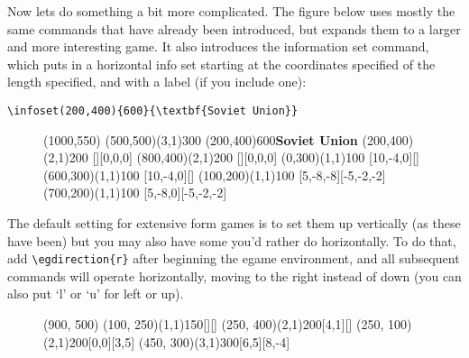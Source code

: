 \documentclass[10.5pt]{article}
\begin{document}
Now lets do something a bit more complicated.  The figure below uses mostly the same commands that have already been introduced, but expands them to a larger and more interesting game.  It also introduces the information set command, which puts in a horizontal info set starting at the coordinates specified of the length specified, and with a label (if you include one):
\begin{verbatim}
\infoset(200,400){600}{\textbf{Soviet Union}}
\end{verbatim}

\begin{figure}[h]
\begin{footnotesize}
\begin{center}
\begin{egame}(1000,550)
\putbranch(500,500)(3,1){300} 
\infoset(200,400){600}{\textbf{Soviet Union}}
\putbranch(200,400)(2,1){200} [][0,0,0]
\putbranch(800,400)(2,1){200} [][0,0,0]
\putbranch(0,300)(1,1){100} [10,-4,0][]
\putbranch(600,300)(1,1){100} [10,-4,0][]
\putbranch(100,200)(1,1){100} [5,-8,-8][-5,-2,-2]
\putbranch(700,200)(1,1){100} [5,-8,0][-5,-2,-2]
\end{egame}
\end{center}
\end{footnotesize}
\end{figure}

\vspace{-.5cm}

The default setting for extensive form games is to set them up vertically (as these have been) but you may also have some you'd rather do horizontally.  To do that, add \verb+\egdirection{r}+ after beginning the egame environment, and all subsequent commands will operate horizontally, moving to the right instead of down (you can also put `l' or `u' for left or up).

\begin{figure}[h]
\begin{footnotesize}
\begin{center}
\begin{egame}(900, 500)
\putbranch(100, 250)(1,1){150}[][]
\putbranch(250, 400)(2,1){200}[4,1][]
\putbranch(250, 100)(2,1){200}[0,0][3,5]
\putbranch(450, 300)(3,1){300}[6,5][8,-4]
\end{egame}
\end{center}
\end{footnotesize}
\end{figure}
\end{document}
